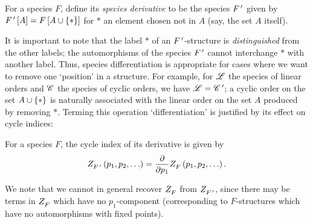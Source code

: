 \documentclass[distribution,draft]{brandiss} %
\numberwithin{section}{chapter}
\numberwithin{figure}{chapter}
\begin{document}
\begin{definition}
  \label{def:specderiv}
  For a species $F$, define its \emph{species derivative} to be the species $ {F}^{\,\prime } $ given by $ {F}^{\,\prime }  \left[ {A} \right] = F \left[ {A \cup \left\{ {*} \right\}} \right]$ for $*$ an element chosen not in $A$ (say, the set $A$ itself).
\end{definition}
It is important to note that the label $*$ of an $ {F}^{\,\prime } $-structure is \emph{distinguished} from the other labels; the automorphisms of the species $ {F}^{\,\prime } $ cannot interchange $*$ with another label.
Thus, species differentiation is appropriate for cases where we want to remove one `position' in a structure.
For example, for $\mathscr{L}$ the species of linear orders and $\mathscr{C}$ the species of cyclic orders, we have $\mathscr{L} =  {\mathscr{C}}^{\,\prime } $; a cyclic order on the set $A \cup \left\{ {*} \right\}$ is naturally associated with the linear order on the set $A$ produced by removing $*$.
Terming this operation `differentiation' is justified by its effect on cycle indices:
\begin{theorem}
  \label{thm:specderivci}
  For a species $F$, the cycle index of its derivative is given by
  \begin{equation}
    \label{eq:specderivci}
     Z_{ {F}^{\,\prime } }^{} \left( {p_{1}, p_{2}, \dots} \right)  = \frac{\partial}{\partial p_{1}}  Z_{F}^{} \left( {p_{1}, p_{2}, \dots} \right) .
  \end{equation}
\end{theorem}
We note that we cannot in general recover $ Z_{F}^{} $ from $ Z_{ {F}^{\,\prime } }^{} $, since there may be terms in $ Z_{F}^{} $ which have no $p_{1}$-component (corresponding to $F$-structures which have no automorphisms with fixed points).
\end{document}
